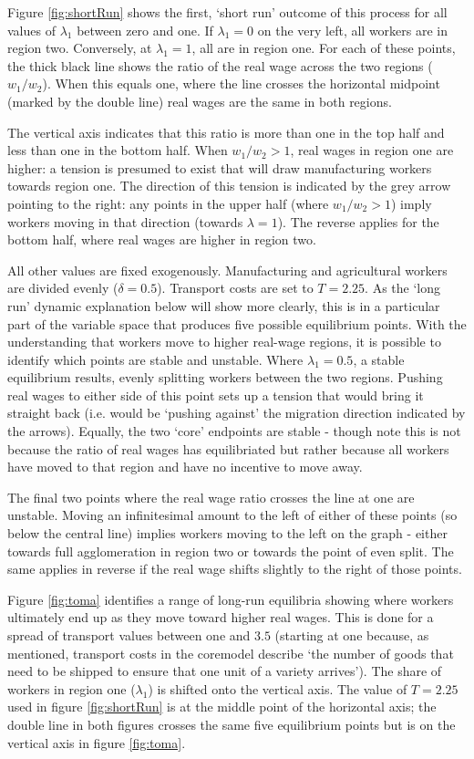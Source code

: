 {Figure \ref{fig:shortRun} shows the first, `short run' outcome of this process for all values of $\lambda_1$ between zero and one. If $\lambda_1 = 0$ on the very left, all workers are in region two. Conversely, at $\lambda_1 = 1$, all are in region one. For each of these points, the thick black line shows the ratio of the real wage across the two regions ($w_1/w_2$). When this equals one, where the line crosses the horizontal midpoint (marked by the double line) real wages are the same in both regions. 

The vertical axis indicates that this ratio is more than one in the top half and less than one in the bottom half. When $w_1/w_2 > 1$, real wages in region one are higher: a tension is presumed to exist that will draw manufacturing workers towards region one. The direction of this tension is indicated by the grey arrow pointing to the right: any points in the upper half (where $w_1/w_2 > 1$) imply workers moving in that direction (towards $\lambda =1$). The reverse applies for the bottom half, where real wages are higher in region two. 

All other values are fixed exogenously. Manufacturing and agricultural workers are divided evenly ($\delta=0.5$). Transport costs are set to $T=2.25$. As the `long run' dynamic explanation below will show more clearly, this is in a particular part of the variable space that produces five possible equilibrium points. With the understanding that workers move to higher real-wage regions, it is possible to identify which points are stable and unstable. Where $\lambda_1=0.5$, a stable equilibrium results, evenly splitting workers between the two regions. Pushing real wages to either side of this point sets up a tension that would bring it straight back (i.e. would be `pushing against' the migration direction indicated by the arrows). Equally, the two `core' endpoints are stable - though note this is not because the ratio of real wages has equilibriated but rather because all workers have moved to that region and have no incentive to move away.

The final two points where the real wage ratio crosses the line at one are unstable. Moving an infinitesimal amount to the left of either of these points (so below the central line) implies workers moving to the left on the graph - either towards full agglomeration in region two or towards the point of even split. The same applies in reverse if the real wage shifts slightly to the right of those points.

Figure \ref{fig:toma} identifies a range of long-run equilibria showing where workers ultimately end up as they move toward higher real wages. This is done for a spread of transport values between one and $3.5$ (starting at one because, as mentioned, transport costs in the \gls{coremodel} describe `the number of goods that need to be shipped to ensure that one unit of a variety arrives'). The share of workers in region one ($\lambda_1$) is shifted onto the vertical axis. The value of $T=2.25$ used in figure \ref{fig:shortRun} is at the middle point of the horizontal axis; the double line in both figures crosses the same five equilibrium points but is on the vertical axis in figure \ref{fig:toma}.

}
